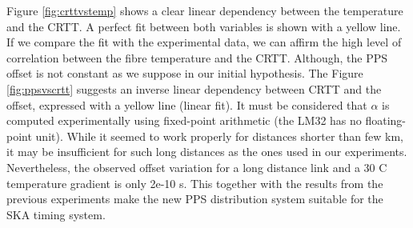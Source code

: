 \FloatBarrier

Figure \ref{fig:crttvstemp} shows a clear linear dependency between the 
temperature and the CRTT. A perfect fit between both variables is shown with a 
yellow line. If we compare the fit with the experimental data, we can affirm 
the high level of correlation between the fibre temperature and the CRTT. 
Although, the PPS offset is not constant as we suppose in our initial 
hypothesis. The Figure \ref{fig:ppsvscrtt} suggests an inverse linear 
dependency between CRTT and the offset, expressed with a yellow line (linear 
fit). It must be considered that $\alpha$ is computed experimentally using 
fixed-point arithmetic (the LM32 has no floating-point unit). While it seemed 
to work properly for distances shorter than few km, it may be insufficient 
for such long distances as the ones used in our experiments. Nevertheless, the 
observed offset variation for a long distance link and a 30 \degree C 
temperature gradient is only 2e-10 s. This together with the results from the 
previous experiments make the new PPS distribution system suitable for the SKA 
timing system.
